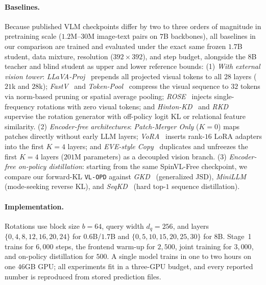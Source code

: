 \documentclass[10pt,twocolumn,letterpaper]{article}
\newcommand{\modelname}{SpinVL}
\begin{document}
\paragraph{Baselines.}
Because published VLM checkpoints differ by two to three orders of magnitude in
pretraining scale ($1.2$M--$30$M image-text pairs on $7$B backbones), all
baselines in our comparison are trained and evaluated under the exact same
frozen $1.7$B student, data mixture, resolution ($392{\times}392$), and step
budget, alongside the $8$B teacher and blind student as upper and lower
reference bounds:
(1) \emph{With external vision tower}: \emph{LLaVA-Proj}~\citep{liu2024improved}
prepends all projected visual tokens to all $28$ layers ($21$k and $28$k);
\emph{FastV}~\citep{chen2024fastv} and \emph{Token-Pool}~\citep{cha2024honeybee}
compress the visual sequence to $32$ tokens via norm-based pruning or spatial
average pooling; \emph{ROSE}~\citep{rose2025} injects single-frequency
rotations with zero visual tokens; and \emph{Hinton-KD}~\citep{hinton2015distilling}
and \emph{RKD}~\citep{park2019rkd} supervise the rotation generator with
off-policy logit KL or relational feature similarity.
(2) \emph{Encoder-free architectures}: \emph{Patch-Merger Only} ($K{=}0$) maps
patches directly without early LLM layers; \emph{VoRA}~\citep{vora2025}
inserts rank-$16$ LoRA adapters into the first $K{=}4$ layers; and
\emph{EVE-style Copy}~\citep{diao2024eve} duplicates and unfreezes the first
$K{=}4$ layers ($201$M parameters) as a decoupled vision branch.
(3) \emph{Encoder-free on-policy distillation}: starting from the same
\modelname-Free checkpoint, we compare our forward-KL \texttt{VL-OPD} against
\emph{GKD}~\citep{agarwal2024gkd} (generalized JSD),
\emph{MiniLLM}~\citep{gu2024minillm} (mode-seeking reverse KL), and
\emph{SeqKD}~\citep{kim2016sequence} (hard top-$1$ sequence distillation).

\paragraph{Implementation.}
Rotations use block size $b{=}64$, query width $d_q{=}256$, and layers
$\{0,4,8,12,16,20,24\}$ for $0.6$B/$1.7$B and $\{0,5,10,15,20,25,30\}$ for
$8$B. Stage~1 trains for $6{,}000$ steps, the frontend warm-up for $2{,}500$,
joint training for $3{,}000$, and on-policy distillation for $500$. A single
model trains in one to two hours on one $46$GB GPU; all experiments fit in a
three-GPU budget, and every reported number is reproduced from stored
prediction files.
\end{document}
